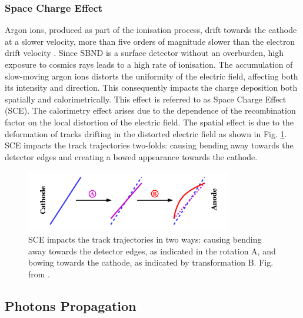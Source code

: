 \subsubsection{Space Charge Effect}
Argon ions, produced as part of the ionisation process, drift towards the cathode at a slower velocity, more than five orders of magnitude slower than the electron drift velocity \cite{icarus_sce}.
Since SBND is a surface detector without an overburden, high exposure to cosmics rays leads to a high rate of ionisation.
The accumulation of slow-moving argon ions distorts the uniformity of the electric field, affecting both its intensity and direction.
This consequently impacts the charge deposition both spatially and calorimetrically.
This effect is referred to as Space Charge Effect (SCE).
The calorimetry effect arises due to the dependence of the recombination factor on the local distortion of the electric field.
The spatial effect is due to the deformation of tracks drifting in the distorted electric field as shown in Fig. \ref{fig:SCE}.
SCE impacts the track trajectories two-folds: causing bending away towards the detector edges and creating a bowed appearance towards the cathode.
\begin{figure}[htbp] 
\centering    
\includegraphics[width=0.8\textwidth]{SCE}
\caption[SCE]{
SCE impacts the track trajectories in two ways: causing bending away towards the detector edges, as indicated in the rotation A, and bowing towards the cathode, as indicated by transformation B.
Fig. from \cite{SCE}.
}
\label{fig:SCE}
\end{figure}

\subsection{Photons Propagation}
\label{sec:photonprop}

